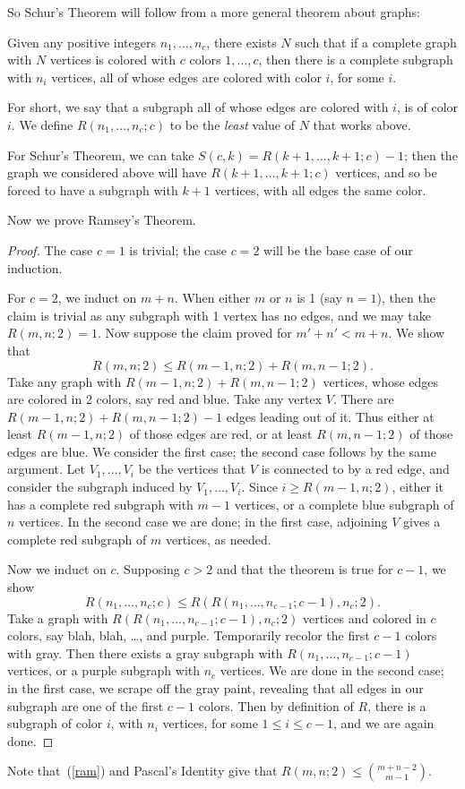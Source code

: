 So Schur's Theorem will follow from a more general theorem about graphs:
\begin{thm}[Ramsey]
Given any positive integers $n_1,\ldots, n_c$, there exists $N$ such that if a complete graph with $N$ vertices is colored with $c$ colors $1,\ldots, c$, then there is a complete subgraph with $n_i$ vertices, all of whose edges are colored with color $i$, for some $i$.
\end{thm}
For short, we say that a subgraph all of whose edges are colored with $i$, is of color $i$. 
We define $R(n_1,\ldots, n_c;c)$ to be the {\it least} value of $N$ that works above.

For Schur's Theorem, we can take $S(c,k)=R(k+1,\ldots, k+1;c)-1$; then the graph we considered above will have $R(k+1,\ldots, k+1;c)$ vertices, and so be forced to have a subgraph with $k+1$ vertices, with all edges the same color.

Now we prove Ramsey's Theorem.
\begin{proof}
The case $c=1$ is trivial; the case $c=2$ will be the base case of our induction. 

For $c=2$, we induct on $m+n$.
When either $m$ or $n$ is 1 (say $n=1$), then the claim is trivial as any subgraph with 1 vertex has no edges, and we may take $R(m,n;2)=1$. Now suppose the claim proved for $m'+n'<m+n$. We show that
\begin{equation}\label{ram}
R(m,n;2)\leq R(m-1,n;2)+R(m,n-1;2).
\end{equation}
Take any graph with $R(m-1,n;2)+R(m,n-1;2)$ vertices, whose edges are colored in 2 colors, say red and blue. Take any vertex $V$. There are $R(m-1,n;2)+R(m,n-1;2)-1$ edges leading out of it. Thus either at least $R(m-1,n;2)$ of those edges are red, or at least $R(m,n-1;2)$ of those edges are blue. We consider the first case; the second case follows by the same argument. Let $V_1,\ldots, V_i$ be the vertices that $V$ is connected to by a red edge, and consider the subgraph induced by $V_1,\ldots, V_i$.  Since $i\geq R(m-1,n;2)$, either it has a complete red subgraph with $m-1$ vertices, or a complete blue subgraph of $n$ vertices. In the second case we are done; in the first case, adjoining $V$ gives a complete red subgraph of $m$ vertices, as needed.

Now we induct on $c$. Supposing $c>2$ and that the theorem is true for $c-1$, we show
\[
R(n_1,\ldots, n_c;c)\leq R(R(n_1,\ldots, n_{c-1};c-1),n_c;2).
\]
Take a graph with $R(R(n_1,\ldots, n_{c-1};c-1),n_c;2)$ vertices and colored in $c$ colors, say blah, blah, \ldots, and purple. Temporarily recolor the first $c-1$ colors with gray. Then there exists a gray subgraph with $R(n_1,\ldots, n_{c-1};c-1)$ vertices, or a purple subgraph with $n_c$ vertices. We are done in the second case; in the first case, we scrape off the gray paint, revealing that all edges in our subgraph are one of the first $c-1$ colors. Then by definition of $R$, there is a subgraph of color $i$, with $n_i$ vertices, for some $1\leq i\leq c-1$, and we are again done.
\end{proof}
Note that~(\ref{ram}) and Pascal's Identity give that $R(m,n;2)\leq \binom{m+n-2}{m-1}$.

